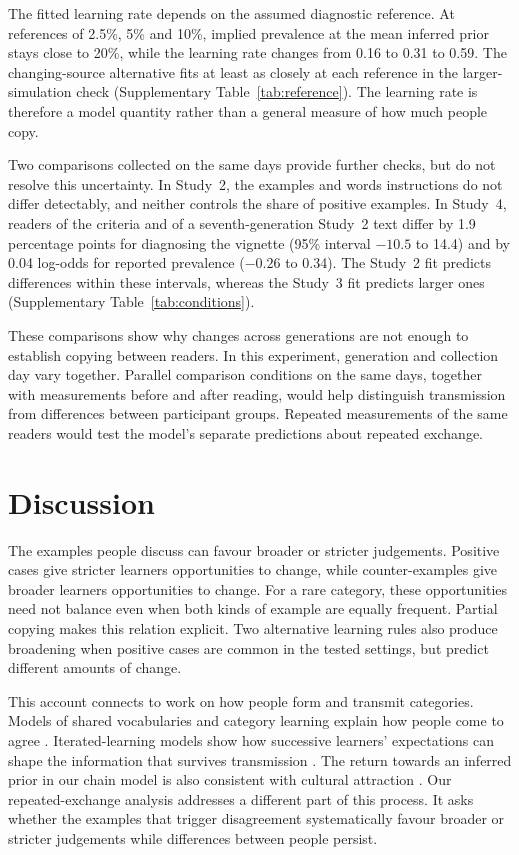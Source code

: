 \documentclass[11pt]{article}
\begin{document}
The fitted learning rate depends on the assumed diagnostic reference. At references of 2.5\%, 5\% and 10\%, implied prevalence at the mean inferred prior stays close to 20\%, while the learning rate changes from 0.16 to 0.31 to 0.59. The changing-source alternative fits at least as closely at each reference in the larger-simulation check (Supplementary Table~\ref{tab:reference}). The learning rate is therefore a model quantity rather than a general measure of how much people copy.

Two comparisons collected on the same days provide further checks, but do not resolve this uncertainty. In Study~2, the examples and words instructions do not differ detectably, and neither controls the share of positive examples. In Study~4, readers of the criteria and of a seventh-generation Study~2 text differ by 1.9 percentage points for diagnosing the vignette (95\% interval $-10.5$ to 14.4) and by 0.04 log-odds for reported prevalence ($-0.26$ to 0.34). The Study~2 fit predicts differences within these intervals, whereas the Study~3 fit predicts larger ones (Supplementary Table~\ref{tab:conditions}).

These comparisons show why changes across generations are not enough to establish copying between readers. In this experiment, generation and collection day vary together. Parallel comparison conditions on the same days, together with measurements before and after reading, would help distinguish transmission from differences between participant groups. Repeated measurements of the same readers would test the model's separate predictions about repeated exchange.

\FloatBarrier
\section{Discussion}

The examples people discuss can favour broader or stricter judgements. Positive cases give stricter learners opportunities to change, while counter-examples give broader learners opportunities to change. For a rare category, these opportunities need not balance even when both kinds of example are equally frequent. Partial copying makes this relation explicit. Two alternative learning rules also produce broadening when positive cases are common in the tested settings, but predict different amounts of change.

This account connects to work on how people form and transmit categories. Models of shared vocabularies and category learning explain how people come to agree \citep{falandays2022,marchetti2020}. Iterated-learning models show how successive learners' expectations can shape the information that survives transmission \citep{griffiths2008,navarro2018}. The return towards an inferred prior in our chain model is also consistent with cultural attraction \citep{claidiere2014}. Our repeated-exchange analysis addresses a different part of this process. It asks whether the examples that trigger disagreement systematically favour broader or stricter judgements while differences between people persist.
\end{document}
